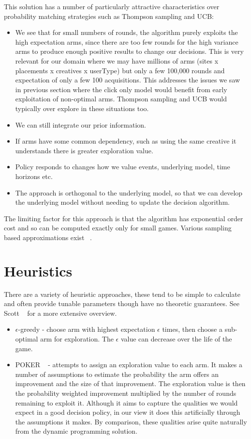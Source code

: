 \documentclass[11pt,a4,singlespacing,titlepagenumber=on]{scrreprt}
\numberwithin{equation}{chapter} %
\theoremstyle{remark}
\begin{document}
This solution has a number of particularly attractive characteristics over probability matching strategies such as Thompson sampling and UCB:
\begin{itemize}
	\item We see that for small numbers of rounds, the algorithm purely exploits the high expectation arms, since there are too few rounds for the high variance arms to produce enough positive results to change our decisions. This is very relevant for our domain where we may have millions of arms (sites x placements x creatives x userType) but only a few 100,000 rounds and expectation of only a few 100 acquisitions. This addresses the issues we saw in previous section where the click only model would benefit from early exploitation of non-optimal arms. Thompson sampling and UCB would typically over explore in these situations too.
	\item We can still integrate our prior information.
	\item If arms have some common dependency, such as using the same creative it understands there is greater exploration value.
	\item Policy responds to changes how we value events, underlying model, time horizons etc.
	\item The approach is orthogonal to the underlying model, so that we can develop the underlying model without needing to update the decision algorithm.
\end{itemize}

The limiting factor for this approach is that the algorithm has exponential order cost and so can be computed exactly only for small games. Various sampling based approximations exist ~\cite{guez2012efficient}.

\section{ Heuristics } \label{sec:heuristics}

There are a variety of heuristic approaches, these tend to be simple to calculate and often provide tunable parameters though have no theoretic guarantees. See Scott ~\cite{scott2010modern} for a more extensive overview.

\begin{itemize}
	\item $\epsilon$-greedy - choose arm with highest expectation $\epsilon$ times, then choose a sub-optimal arm for exploration. The $\epsilon$ value can decrease over the life of the game.
	\item POKER ~\cite{vermorel2005multi} - attempts to assign an exploration value to each arm. It makes a number of assumptions to estimate the probability the arm offers an improvement and the size of that improvement. The exploration value is then the probability weighted improvement multiplied by the number of rounds remaining to exploit it. Although it aims to capture the qualities we would expect in a good decision policy, in our view it does this artificially through the assumptions it makes. By comparison, these qualities arise quite naturally from the dynamic programming solution.
\end{itemize}
\end{document}

